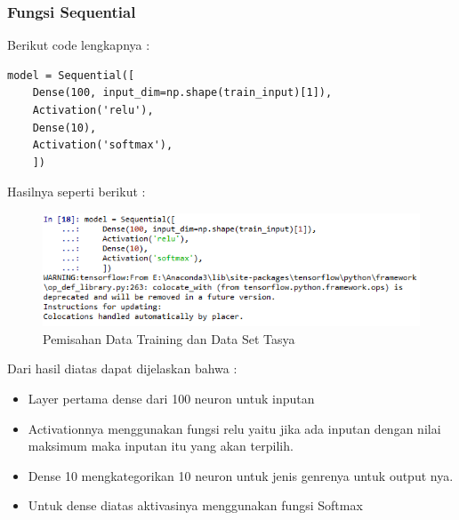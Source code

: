 \subsubsection{Fungsi Sequential}
Berikut code lengkapnya :
\begin{verbatim}
model = Sequential([
    Dense(100, input_dim=np.shape(train_input)[1]),
    Activation('relu'),
    Dense(10),
    Activation('softmax'),
    ])
\end{verbatim}
Hasilnya seperti berikut :\\
\begin{figure}[ht]
\centering
\includegraphics[scale=0.5]{figures/chapter6tasya17.png}
\caption{Pemisahan Data Training dan Data Set Tasya}
\label{Praktek}
\end{figure}
Dari hasil diatas dapat dijelaskan bahwa :\\
\begin{itemize}
\item Layer pertama dense dari 100 neuron untuk inputan
\item Activationnya menggunakan fungsi relu yaitu jika ada inputan dengan nilai maksimum maka inputan itu yang akan terpilih.
\item Dense 10 mengkategorikan 10 neuron untuk jenis genrenya untuk output nya.
\item Untuk dense diatas aktivasinya menggunakan fungsi Softmax
\end{itemize}

